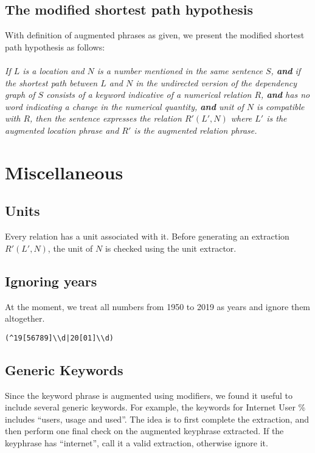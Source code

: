 \documentclass[a4paper,10pt]{article}
\begin{document}
\subsection{The modified shortest path hypothesis}
With definition of augmented phrases as given, we present the modified shortest path hypothesis as follows:
\\
\\
\emph{If $L$ is a location and $N$ is a number mentioned in the same
sentence $S$, \textbf{and} if the shortest path between $L$ and $N$ in the undirected version of the dependency graph of $S$ consists of a keyword 
indicative of a numerical relation $R$, \textbf{and} has no word indicating a change in the numerical quantity, \textbf{and} unit of $N$ is compatible with $R$,
then the sentence expresses the relation \textbf{\color{blue} $R'(L', N)$} where $L'$ is the augmented location phrase and $R'$ is the augmented relation phrase.}

\section{Miscellaneous}

\subsection{Units}
Every relation has a unit associated with it. Before generating an extraction $R'(L', N)$, the unit of $N$ is checked using the unit extractor.

\subsection{Ignoring years}
 At the moment, we treat all numbers from 1950 to 2019 as years and ignore them altogether.
 \begin{verbatim}
(^19[56789]\\d|20[01]\\d)  
 \end{verbatim}

\subsection{Generic Keywords}
Since the keyword phrase is augmented using modifiers, we found it useful to include several generic keywords. For example, 
the keywords for Internet User \% includes ``users, usage and used''. The idea is to first complete the extraction, and then 
perform one final check on the augmented keyphrase extracted. If the keyphrase has ``internet'', call it a valid extraction, otherwise ignore it.
\end{document}
